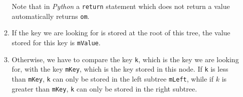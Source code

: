 \begin{enumerate}
\begin{enumerate}
            Note that in \textsl{Python} a \texttt{return} statement which does not return a value 
            automatically returns \texttt{om}.
      \item If the key we are looking for is stored at the root of this tree, the value stored for
            this key is \texttt{mValue}.
      \item Otherwise, we have to compare the key \texttt{k}, which is the key we are looking for,
            with the key \texttt{mKey}, which is the key stored in this node.  If \texttt{k}
            is less than \texttt{mKey}, \texttt{k} can only be stored in the left subtree
            \texttt{mLeft}, while if $k$ is greater than \texttt{mKey}, \texttt{k} can only be
            stored in the right subtree.
      \end{enumerate}



\end{enumerate}
